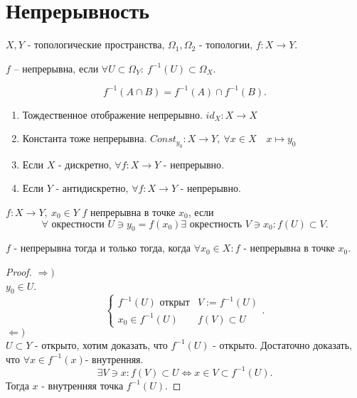 \documentclass[12pt]{report}
\begin{document}
\section{Непрерывность}
$X, Y$ - топологические пространства, $\Omega_1, \Omega_2$ -  топологии, $f: X \to  Y$.
\begin{defn}
    $f$ -- непрерывна, если $\forall U \subset \Omega _Y: ~ f^{-1} (U)\subset \Omega_X$.
\end{defn}
\begin{note}
    \[
	f^{-1} (A \cap B) = f^{-1}(A) \cap f^{-1}(B)
    .\] 
\end{note}
\begin{exs}
    \begin{enumerate}
	\item Тождественное отображение непрерывно. $id_X : X \to  X$
	\item Константа тоже непрерывна. $Const_{y_0}:X \to Y, ~ \forall x \in  X \quad x\mapsto y_0 $
	\item Если $X$ - дискретно, $\forall f: X \to  Y$ - непрерывно.
	\item Если $Y$ - антидискретно, $\forall f: X \to  Y$ - непрерывно.
    \end{enumerate}
\end{exs}
\begin{defn}
    $f: X \to  Y, ~ x_0 \in Y$
    $f$ непрерывна в точке $ x_0$, если \[
	\forall \mbox{ окрестности } U \ni y_0 = f(x_0) \exists \mbox{ окрестность } V \ni x_0: f(U) \subset V
    .\] 
\end{defn}
\begin{thm}
    $f$ - непрерывна тогда и только тогда, когда $\forall x_0 \in  X: f$ - непрерывна в точке $x_0$.
\end{thm}
\begin{proof}
    $\Rightarrow )$\\
	$y_0 \in  U$.
	\[
	\left \{ 
	    \begin{array}{ll}
		f^{-1}(U) \mbox{ открыт} & V:=f^{-1}(U)\\
		x_0 \in f^{-1}(U) & f(V) \subset U
	        
	    \end{array}
	    \right .
	.\] 
	$\Leftarrow )$\\
	$U \subset Y$ - открыто, хотим доказать, что $f^{-1}(U)$ - открыто.
	Достаточно доказать, что $\forall x \in  f^{-1}(x) $- внутренняя.
	\[
	    \exists V \ni x: f(V)\subset U \Leftrightarrow x \in  V \subset f^{-1}(U)
	.\] 
	Тогда $x$ - внутренняя точка $f^{-1}(U)$.
\end{proof}
\end{document}
